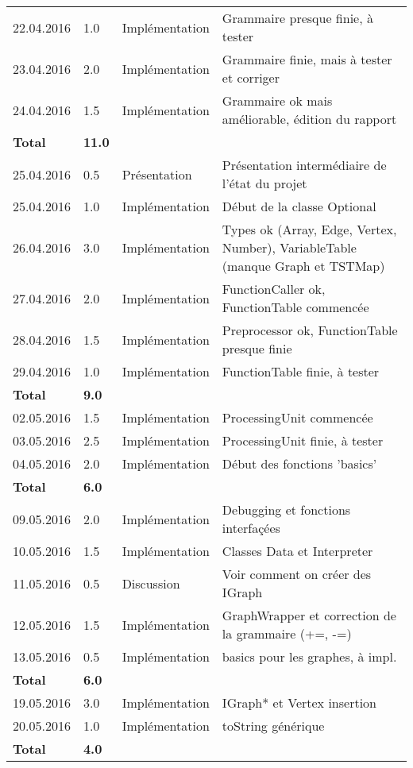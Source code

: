 \documentclass[french]{article}
\begin{document}
\begin{longtable}{p{}|p{}|p{}|p{}}
		22.04.2016 & 1.0 & Implémentation & Grammaire presque finie, à tester\\
		23.04.2016 & 2.0 & Implémentation & Grammaire finie, mais à tester et corriger\\
		24.04.2016 & 1.5 & Implémentation & Grammaire ok mais améliorable, édition du rapport\\   
		\textbf{Total} & \textbf{11.0} &&\\
		\hline
		25.04.2016 & 0.5 & Présentation & Présentation intermédiaire de l'état du projet\\
		25.04.2016 & 1.0 & Implémentation & Début de la classe Optional\\
		26.04.2016 & 3.0 & Implémentation & Types ok (Array, Edge, Vertex, Number), VariableTable (manque Graph et TSTMap)\\
		27.04.2016 & 2.0 & Implémentation & FunctionCaller ok, FunctionTable commencée\\
		28.04.2016 & 1.5 & Implémentation & Preprocessor ok, FunctionTable presque finie\\
		29.04.2016 & 1.0 & Implémentation & FunctionTable finie, à tester\\  
		\textbf{Total} & \textbf{9.0} &&\\
		\hline
		02.05.2016 & 1.5 & Implémentation & ProcessingUnit commencée\\
		03.05.2016 & 2.5 & Implémentation & ProcessingUnit finie, à tester\\
		04.05.2016 & 2.0 & Implémentation & Début des fonctions 'basics'\\  
		\textbf{Total} & \textbf{6.0} &&\\
		\hline 
		09.05.2016 & 2.0 & Implémentation & Debugging et fonctions interfaçées\\
		10.05.2016 & 1.5 & Implémentation & Classes Data et Interpreter\\
		11.05.2016 & 0.5 & Discussion & Voir comment on créer des IGraph\\
		12.05.2016 & 1.5 & Implémentation & GraphWrapper et correction de la grammaire (+=, -=)\\
		13.05.2016 & 0.5 & Implémentation & basics pour les graphes, à impl.\\  
		\textbf{Total} & \textbf{6.0} &&\\
		\hline
		19.05.2016 & 3.0 & Implémentation & IGraph* et Vertex insertion\\
		20.05.2016 & 1.0 & Implémentation & toString générique\\  
		\textbf{Total} & \textbf{4.0} &&\\

\end{longtable}
\end{document}
